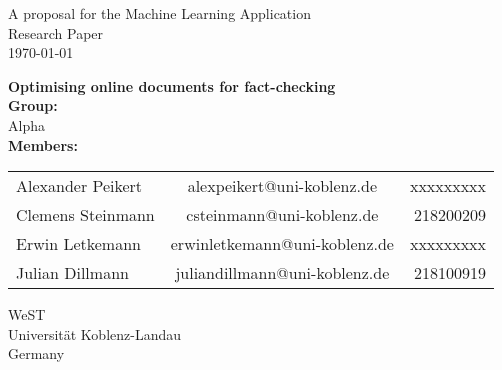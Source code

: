 \documentclass[10pt]{article}
\begin{document}
\begin{titlepage}
\begin{center}


A proposal for the Machine Learning Application\\
Research Paper\\
\vspace{4mm}
\today
\vspace{4mm}
\end{center}
\begin{center}
\textbf{\Large Optimising online documents for fact-checking}\\
\vspace{15mm}
\textbf{Group:}\\
\vspace{2mm}
Alpha \\
\vspace{15mm}
\textbf {Members:}\\
\vspace{2mm}
\end{center}
\begin{tabular}{ l c r }
  Alexander Peikert & alexpeikert@uni-koblenz.de & xxxxxxxxx \\
  Clemens Steinmann & csteinmann@uni-koblenz.de & 218200209 \\
  Erwin Letkemann & erwinletkemann@uni-koblenz.de & xxxxxxxxx \\
  Julian Dillmann & juliandillmann@uni-koblenz.de & 218100919 \\
\end{tabular}
\vfill
\begin{center}
\vspace{8mm}
WeST \\
Universität Koblenz-Landau \\
Germany \\
\vspace{2mm}
\end{center}
\clearpage
\end{titlepage}
\end{document}
